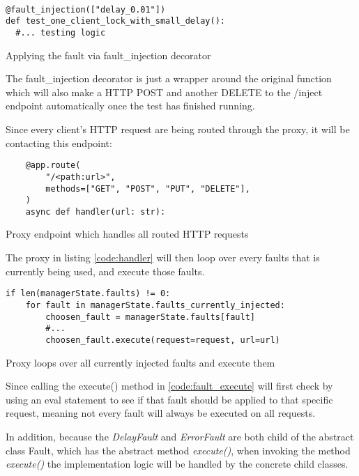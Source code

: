 \begin{listing}[!ht]
  \begin{verbatim}
    
@fault_injection(["delay_0.01"])
def test_one_client_lock_with_small_delay():
  #... testing logic
  \end{verbatim}
  \caption{Applying the fault via fault\_injection decorator}
\end{listing}

The fault\_injection decorator is just a wrapper around the original function 
which will also make a HTTP POST and another DELETE to the /inject endpoint 
automatically once the test has finished running.
 

Since every client's HTTP request are being routed through the proxy, it will be
contacting this endpoint:
\begin{listing}[!ht]
  \begin{verbatim}
    @app.route(
        "/<path:url>",
        methods=["GET", "POST", "PUT", "DELETE"],
    )
    async def handler(url: str):
  \end{verbatim}
  \caption{Proxy endpoint which handles all routed HTTP requests}
  \label{code:handler}
\end{listing}

The proxy in listing \ref{code:handler} will then loop over every faults that is currently being used, and execute
those faults.

\begin{listing}[!ht]
  \begin{verbatim}
if len(managerState.faults) != 0:
    for fault in managerState.faults_currently_injected:
        choosen_fault = managerState.faults[fault]
        #...
        choosen_fault.execute(request=request, url=url)
  \end{verbatim}
  \caption{Proxy loops over all currently injected faults and execute them}
  \label{code:fault_execute}
\end{listing}

Since calling the execute() method in \ref{code:fault_execute} will first check by 
using an eval statement to see if that fault should be applied to that specific 
request, meaning not every fault will always be executed on all requests.

In addition, because the \textit{DelayFault} and \textit{ErrorFault} are both 
child of the abstract class Fault, which has the abstract method \textit{execute()},
when invoking the method \textit{execute()} the implementation logic will be handled 
by the concrete child classes.
